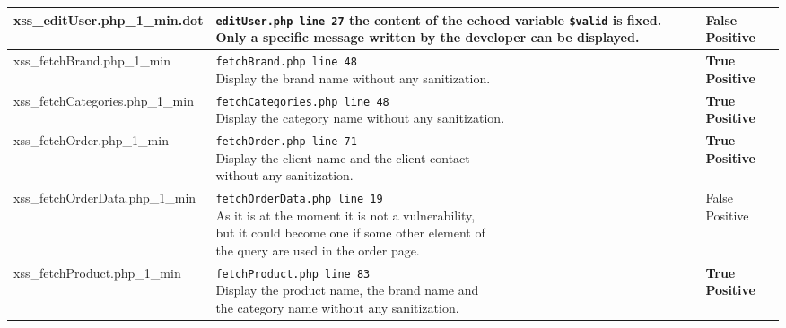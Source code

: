 \documentclass[11pt]{article}
\begin{document}
\begin{longtable}[H]{| p{} | p{} | p{} |}
	 	\hline
	  	xss\_editUser.php\_1\_min.dot 	
	  	& \makecell{ \texttt{editUser.php line 27} \\
				 the content of the echoed variable \\
				 \texttt{\$valid} is fixed. Only a specific message\\
				  written by the developer can be displayed.}  
	 	& False Positive \\



	 	\hline
	  	xss\_fetchBrand.php\_1\_min 	
	  	& \makecell{ \texttt{fetchBrand.php line 48} \\
				 Display the brand name without any sanitization.}  
	 	& \textbf{True Positive}\\

	 	\hline
	  	xss\_fetchCategories.php\_1\_min 	
	  	& \makecell{ \texttt{fetchCategories.php line 48} \\
					Display the category name without any sanitization.}  
	 	& \textbf{True Positive}\\

	 	\hline
	  	xss\_fetchOrder.php\_1\_min	
	  	& \makecell{ \texttt{fetchOrder.php line 71} \\
				Display the client name and the client contact \\
				without any sanitization.}  
	 	& \textbf{True Positive}\\

	 	\hline
	  	xss\_fetchOrderData.php\_1\_min 	
	  	& \makecell{ \texttt{fetchOrderData.php line 19} \\
				 As it is at the moment it is not a vulnerability,\\ 
				 but it could become one if some other element
				 of \\ the query are used in the order page.}  
	 	& False Positive \\

	 	\hline
	  	xss\_fetchProduct.php\_1\_min 	
	  	& \makecell{ \texttt{fetchProduct.php line 83} \\
				 Display the product name, the brand name and \\
				 the category name without any sanitization.}  
	 	& \textbf{True Positive}\\


\end{longtable}
\end{document}
